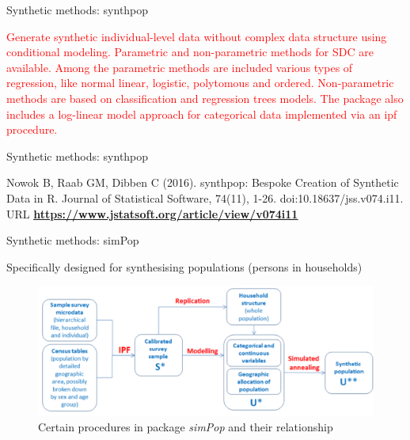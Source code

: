 \documentclass[
	aspectratio = 169
 ]{beamer}
\begin{document}
\begin{frame}{Synthetic methods: synthpop}

\textcolor{red}{Generate synthetic individual-level data without complex data structure using conditional
modeling. Parametric and non-parametric methods for SDC are available. Among the parametric methods are
included various types of regression, like normal linear, logistic, polytomous
and ordered. Non-parametric methods are based on classification and regression trees models. The package also includes a log-linear model approach for
categorical data implemented via an ipf procedure.}

\end{frame}
\begin{frame}{Synthetic methods: synthpop}

Nowok B, Raab GM, Dibben C (2016). synthpop: Bespoke Creation of
Synthetic Data in R. Journal of Statistical Software, 74(11), 1-26.
doi:10.18637/jss.v074.i11. URL
\href{https://www.jstatsoft.org/article/view/v074i11}{\color{blue}\underline{\textbf{https://www.jstatsoft.org/article/view/v074i11}}}

\end{frame}
\begin{frame}{Synthetic methods: simPop}

Specifically designed for synthesising populations (persons in households)

\begin{figure}
    \centering
    \includegraphics[width=\textwidth]{Presentation TEX/gallery/pipeline_simPop.png}
    \caption{Certain procedures in package \emph{simPop} and their
relationship}
\end{figure}

\end{frame}
\end{document}
